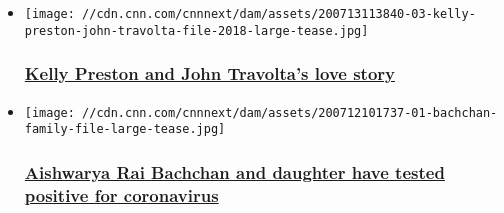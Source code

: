 \begin{itemize}
\item
  \href{/2020/07/13/entertainment/kelly-preston-john-travolta-love-story/index.html}{}

  \texttt{[image: //cdn.cnn.com/cnnnext/dam/assets/200713113840-03-kelly-preston-john-travolta-file-2018-large-tease.jpg]}

  \hypertarget{kelly-preston-and-john-travoltas-love-story-}{%
  \subsubsection{\texorpdfstring{\href{/2020/07/13/entertainment/kelly-preston-john-travolta-love-story/index.html}{Kelly
  Preston and John Travolta's love story
  }}{Kelly Preston and John Travolta's love story }}\label{kelly-preston-and-john-travoltas-love-story-}}
\item
  \href{/2020/07/12/entertainment/aishwarya-rai-aradhya-bachchan-coronavvirus/index.html}{}

  \texttt{[image: //cdn.cnn.com/cnnnext/dam/assets/200712101737-01-bachchan-family-file-large-tease.jpg]}

  \hypertarget{aishwarya-rai-bachchan-and-daughter-have-tested-positive-for-coronavirus}{%
  \subsubsection{\texorpdfstring{\href{/2020/07/12/entertainment/aishwarya-rai-aradhya-bachchan-coronavvirus/index.html}{Aishwarya
  Rai Bachchan and daughter have tested positive for
  coronavirus}}{Aishwarya Rai Bachchan and daughter have tested positive for coronavirus}}\label{aishwarya-rai-bachchan-and-daughter-have-tested-positive-for-coronavirus}}
\end{itemize}


